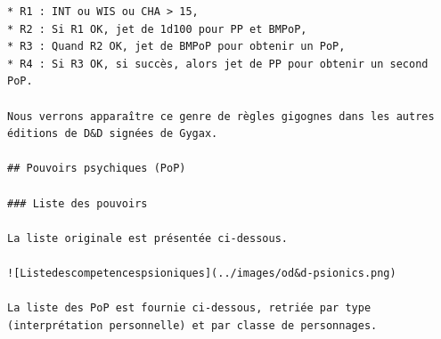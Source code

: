\documentclass[12pt]{article}
\begin{document}
{\begin{verbatim}
* R1 : INT ou WIS ou CHA > 15,
* R2 : Si R1 OK, jet de 1d100 pour PP et BMPoP,
* R3 : Quand R2 OK, jet de BMPoP pour obtenir un PoP,
* R4 : Si R3 OK, si succès, alors jet de PP pour obtenir un second PoP.

Nous verrons apparaître ce genre de règles gigognes dans les autres éditions de D&D signées de Gygax.

## Pouvoirs psychiques (PoP)

### Liste des pouvoirs

La liste originale est présentée ci-dessous.

![Listedescompetencespsioniques](../images/od&d-psionics.png)

La liste des PoP est fournie ci-dessous, retriée par type (interprétation personnelle) et par classe de personnages.


\end{verbatim}}
\end{document}

